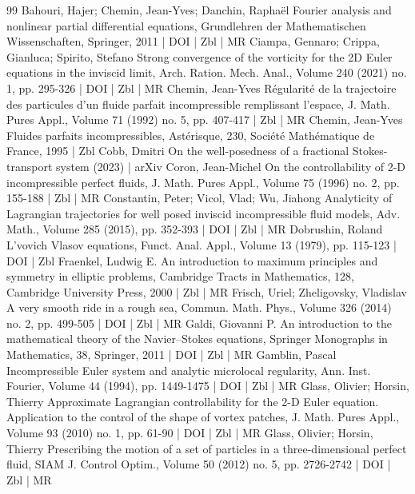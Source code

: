 \documentclass[10pt]{amsart}
\theoremstyle{definition}\newtheorem{defi}[theo]{Definition}\newtheorem{rema}[theo]{Remark}\newtheorem{exam}[theo]{Example}\newtheorem{exem}[theo]{Example}\newtheorem{nota}[theo]{Notation}
\begin{document}
\begin{thebibliography}{99}
 Bahouri, Hajer; Chemin, Jean-Yves; Danchin, Raphaël Fourier analysis and nonlinear partial differential equations, Grundlehren der Mathematischen Wissenschaften, Springer, 2011 | DOI | Zbl | MR
 Ciampa, Gennaro; Crippa, Gianluca; Spirito, Stefano Strong convergence of the vorticity for the 2D Euler equations in the inviscid limit, Arch. Ration. Mech. Anal., Volume 240 (2021) no. 1, pp. 295-326 | DOI | Zbl | MR
 Chemin, Jean-Yves Régularité de la trajectoire des particules d’un fluide parfait incompressible remplissant l’espace, J. Math. Pures Appl., Volume 71 (1992) no. 5, pp. 407-417 | Zbl | MR
 Chemin, Jean-Yves Fluides parfaits incompressibles, Astérisque, 230, Société Mathématique de France, 1995 | Zbl
 Cobb, Dmitri On the well-posedness of a fractional Stokes-transport system (2023) | arXiv
 Coron, Jean-Michel On the controllability of 2-D incompressible perfect fluids, J. Math. Pures Appl., Volume 75 (1996) no. 2, pp. 155-188 | Zbl | MR
 Constantin, Peter; Vicol, Vlad; Wu, Jiahong Analyticity of Lagrangian trajectories for well posed inviscid incompressible fluid models, Adv. Math., Volume 285 (2015), pp. 352-393 | DOI | Zbl | MR
 Dobrushin, Roland L’vovich Vlasov equations, Funct. Anal. Appl., Volume 13 (1979), pp. 115-123 | DOI | Zbl
 Fraenkel, Ludwig E. An introduction to maximum principles and symmetry in elliptic problems, Cambridge Tracts in Mathematics, 128, Cambridge University Press, 2000 | Zbl | MR
 Frisch, Uriel; Zheligovsky, Vladislav A very smooth ride in a rough sea, Commun. Math. Phys., Volume 326 (2014) no. 2, pp. 499-505 | DOI | Zbl | MR
 Galdi, Giovanni P. An introduction to the mathematical theory of the Navier–Stokes equations, Springer Monographs in Mathematics, 38, Springer, 2011 | DOI | Zbl | MR
 Gamblin, Pascal Incompressible Euler system and analytic microlocal regularity, Ann. Inst. Fourier, Volume 44 (1994), pp. 1449-1475 | DOI | Zbl | MR
 Glass, Olivier; Horsin, Thierry Approximate Lagrangian controllability for the 2-D Euler equation. Application to the control of the shape of vortex patches, J. Math. Pures Appl., Volume 93 (2010) no. 1, pp. 61-90 | DOI | Zbl | MR
 Glass, Olivier; Horsin, Thierry Prescribing the motion of a set of particles in a three-dimensional perfect fluid, SIAM J. Control Optim., Volume 50 (2012) no. 5, pp. 2726-2742 | DOI | Zbl | MR

\end{thebibliography}
\end{document}
